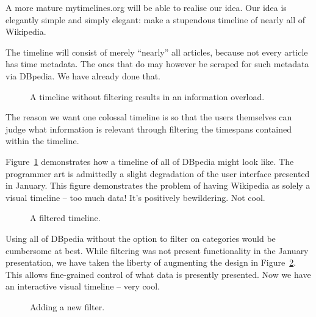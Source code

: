 A more mature mytimelines.org will be able to realise our idea. Our idea is 
elegantly simple and simply elegant: make a stupendous timeline of nearly all 
of Wikipedia.

The timeline will consist of merely ``nearly'' all articles, because not every 
article has time metadata. The ones that do may however be scraped for such 
metadata via DBpedia. We have already done that.

\begin{figure}[H]
  \centering
  \begin{scale}{0.3}
    
  \end{scale}
  \caption{A timeline without filtering results in an information overload.}
  \label{fig:overload}
\end{figure}

The reason we want one colossal timeline is so that the users themselves can 
judge what information is relevant through filtering the timespans contained 
within the timeline.

Figure~\ref{fig:overload} demonstrates how a timeline of all of DBpedia might 
look like. The programmer art is admittedly a slight degradation of the user 
interface presented in January. This figure demonstrates the problem of having 
Wikipedia as solely a visual timeline -- too much data! It's positively 
bewildering. Not cool.

\begin{figure}[H]
  \centering
  \begin{scale}{0.3}
    
  \end{scale}
  \caption{A filtered timeline.}
  \label{fig:filtered}
\end{figure}

Using all of DBpedia without the option to filter on categories would be
cumbersome at best. While filtering was not present functionality in the
January presentation, we have taken the liberty of augmenting the design in
Figure~\ref{fig:filtered}. This allows fine-grained control of what data is
presently presented. Now we have an interactive visual timeline -- very cool.

\begin{figure}[H]
  \centering
  \begin{scale}{0.5}
    
  \end{scale}
  \caption{Adding a new filter.}
  \label{fig:filters}
\end{figure}

